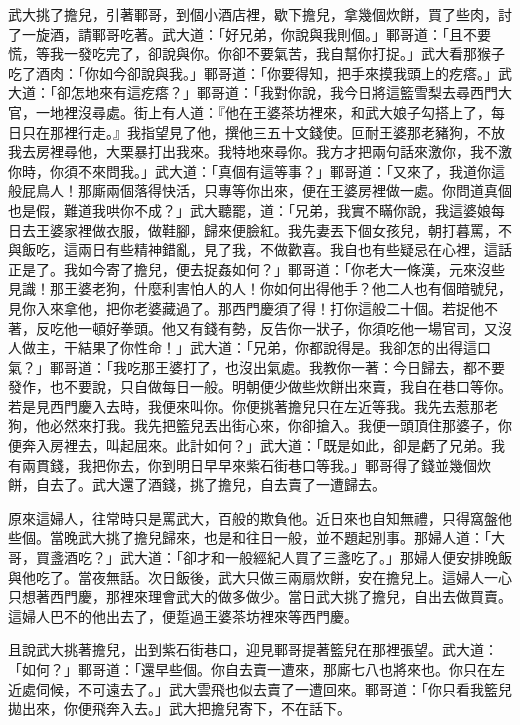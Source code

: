 \begin{showcontents}{}
武大挑了擔兒，引著鄆哥，到個小酒店裡，歇下擔兒，拿幾個炊餅，買了些肉，討了一旋酒，請鄆哥吃著。武大道：「好兄弟，你說與我則個。」鄆哥道：「且不要慌，等我一發吃完了，卻說與你。你卻不要氣苦，我自幫你打捉。」武大看那猴子吃了酒肉：「你如今卻說與我。」鄆哥道：「你要得知，把手來摸我頭上的疙瘩。」武大道：「卻怎地來有這疙瘩？」鄆哥道：「我對你說，我今日將這籃雪梨去尋西門大官，一地裡沒尋處。街上有人道：『他在王婆茶坊裡來，和武大娘子勾搭上了，每日只在那裡行走。』我指望見了他，撰他三五十文錢使。叵耐王婆那老豬狗，不放我去房裡尋他，大栗暴打出我來。我特地來尋你。我方才把兩句話來激你，我不激你時，你須不來問我。」武大道：「真個有這等事？」鄆哥道：「又來了，我道你這般屁鳥人！那廝兩個落得快活，只專等你出來，便在王婆房裡做一處。你問道真個也是假，難道我哄你不成？」武大聽罷，道：「兄弟，我實不瞞你說，我這婆娘每日去王婆家裡做衣服，做鞋腳，歸來便臉紅。我先妻丟下個女孩兒，朝打暮罵，不與飯吃，這兩日有些精神錯亂，見了我，不做歡喜。我自也有些疑忌在心裡，這話正是了。我如今寄了擔兒，便去捉姦如何？」鄆哥道：「你老大一條漢，元來沒些見識！那王婆老狗，什麼利害怕人的人！你如何出得他手？他二人也有個暗號兒，見你入來拿他，把你老婆藏過了。那西門慶須了得！打你這般二十個。若捉他不著，反吃他一頓好拳頭。他又有錢有勢，反告你一狀子，你須吃他一場官司，又沒人做主，干結果了你性命！」武大道：「兄弟，你都說得是。我卻怎的出得這口氣？」鄆哥道：「我吃那王婆打了，也沒出氣處。我教你一著：今日歸去，都不要發作，也不要說，只自做每日一般。明朝便少做些炊餅出來賣，我自在巷口等你。若是見西門慶入去時，我便來叫你。你便挑著擔兒只在左近等我。我先去惹那老狗，他必然來打我。我先把籃兒丟出街心來，你卻搶入。我便一頭頂住那婆子，你便奔入房裡去，叫起屈來。此計如何？」武大道：「既是如此，卻是虧了兄弟。我有兩貫錢，我把你去，你到明日早早來紫石街巷口等我。」鄆哥得了錢並幾個炊餅，自去了。武大還了酒錢，挑了擔兒，自去賣了一遭歸去。

原來這婦人，往常時只是罵武大，百般的欺負他。近日來也自知無禮，只得窩盤他些個。當晚武大挑了擔兒歸來，也是和往日一般，並不題起別事。那婦人道：「大哥，買盞酒吃？」武大道：「卻才和一般經紀人買了三盞吃了。」那婦人便安排晚飯與他吃了。當夜無話。次日飯後，武大只做三兩扇炊餅，安在擔兒上。這婦人一心只想著西門慶，那裡來理會武大的做多做少。當日武大挑了擔兒，自出去做買賣。這婦人巴不的他出去了，便踅過王婆茶坊裡來等西門慶。

且說武大挑著擔兒，出到紫石街巷口，迎見鄆哥提著籃兒在那裡張望。武大道：「如何？」鄆哥道：「還早些個。你自去賣一遭來，那廝七八也將來也。你只在左近處伺候，不可遠去了。」武大雲飛也似去賣了一遭回來。鄆哥道：「你只看我籃兒拋出來，你便飛奔入去。」武大把擔兒寄下，不在話下。


\end{showcontents}
